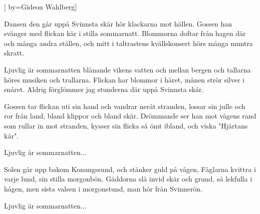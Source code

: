 


[ 	%
	by={Gideon Wahlberg}]		%
	
\beginverse*		%
Dansen den går uppå Svinnsta skär
hör klackarna mot hällen.
Gossen han svänger med flickan kär
i stilla sommarnatt.
Blommorna doftar från hagen där
och många andra ställen,
och mitt i taltrastens kvällskonsert
hörs många muntra skratt.
\endverse			%

\beginchorus	
Ljuvlig är sommarnatten
blånande vikens vatten
och mellan bergen och tallarna
höres musiken och trallarna.
Flickan har blommor i håret,
månen strör silver i snåret.
Aldrig förglömmer jag stunderna där
uppå Svinnsta skär.
\endchorus

\beginverse*		%
Gossen tar flickan uti sin hand 
och vandrar neråt stranden,
lossar sin julle och ror från land, 
bland klippor och bland skär.
Drömmande ser han mot vågens rand
som rullar in mot stranden,
kysser sin flicka så ömt ibland, 
och viska "Hjärtans kär".
\endverse			%

\beginchorus	
Ljuvlig är sommarnatten...
\endchorus

\beginverse*		%
Solen går upp bakom Konungssund, 
och stänker guld på vågen,
Fåglarna kvittra i varje lund, 
sin stilla morgonbön.
Gäddorna slå invid skär och grund, 
så lekfulla i hågen,
men sista valsen i morgonstund, 
man hör från Svinnerön.
\endverse			%

\beginchorus	
Ljuvlig är sommarnatten...
\endchorus
\endsong			%
